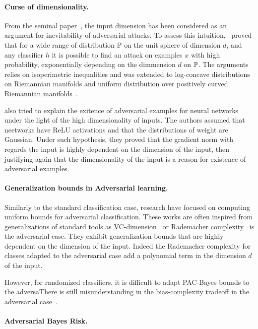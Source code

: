 \paragraph{Curse of dimensionality.} From the seminal paper~\citep{szegedy2014intriguing}, the input dimension has been considered as an argument for inevitability of adversarial attacks. To assess this intuition,~\citet{goodfelleshafahi2018adversarial} proved that for a wide range of distribution $\mathbb{P}$ on the unit sphere of dimension $d$, and any classifier $h$ it is possible to find an attack on examples $x$ with high probability, exponentially depending on the dimmension $d$ on $\mathbb{P}$. The arguments relies on isoperimetric inequalities and was extended to log-concave distributions on Riemannian manifolds and uniform distribution over positively curved Riemannian manifolds~\citep{pmlr-v97-dohmatob19a}. 

\citep{simon2019first} also tried to explain the exitence of adversarial examples for neural networks under the light of the high dimensionality of inputs. The authors assumed that neetworks have ReLU activations and that the distributions of weight are Gaussian. Under such hypothesis, they proved that the gradient norm with regards the input is highly dependent on the dimension of the input, then justifying again that the dimensionality of the input is a reason for existence of adversarial examples. 




\paragraph{Generalization bounds in Adversarial learning.} Similarly to the standard classification case, research have focused on computing uniform bounds for adversarial classification. These works are often inspired from generalizations of standard tools as VC-dimension~\citep{cullina2018pac} or Rademacher complexity~\citep{yin2019rademacher,khim2018adversarial,awasthi2020adversarial} is the adversarial case. They exhibit generalization bounds that are highly dependent on the dimension of the input. Indeed the Rademacher complexity for classes adapted to the adversarial case add a polynomial term in the dimension $d$ of the input. 

However, for randomized classifiers, it is difficult to adapt PAC-Bayes bounds to the adversaThere is still misunderstanding in the bias-complexity tradeoff in the adversarial case~\citep{xxx}. 

\paragraph{Adversarial Bayes Risk.} 